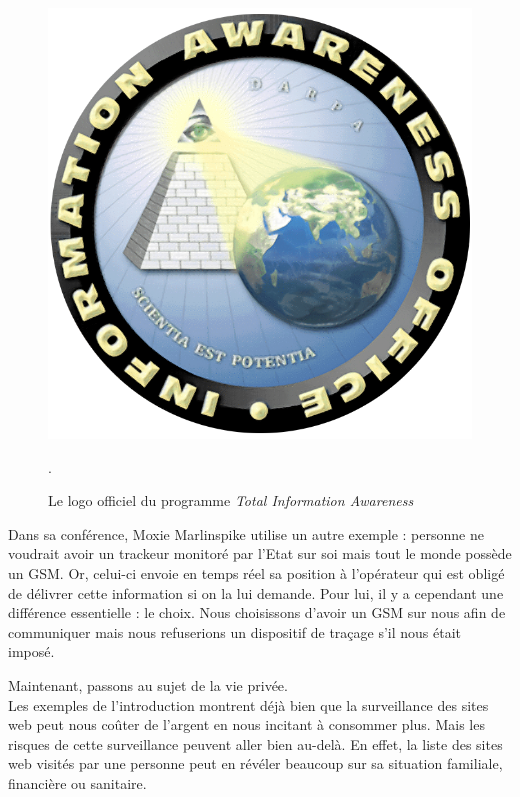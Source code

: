 \begin{figure}[h]
	\centering
	\includegraphics[scale=0.2]{figures/IAO-logo.png}
	\caption{\label{IAO_logo}Le logo officiel du programme \textit{Total Information Awareness}}.
\end{figure}

Dans sa conférence, Moxie Marlinspike utilise un autre exemple : personne ne voudrait avoir un trackeur monitoré par l'Etat sur soi mais tout le monde possède un GSM. Or, celui-ci envoie en temps réel sa position à l'opérateur qui est obligé de délivrer cette information si on la lui demande. Pour lui, il y a cependant une différence essentielle : le choix. Nous choisissons d'avoir un GSM sur nous afin de communiquer mais nous refuserions un dispositif de traçage s'il nous était imposé.
\newline


Maintenant, passons au sujet de la vie privée.\\
Les exemples de l'introduction montrent déjà bien que la surveillance des sites web peut nous coûter de l'argent en nous incitant à consommer plus. Mais les risques de cette surveillance peuvent aller bien au-delà. En effet, la liste des sites web visités par une personne peut en révéler beaucoup sur sa situation familiale, financière ou sanitaire.
\newline

